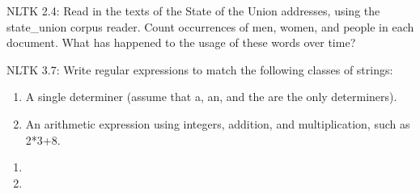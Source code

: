 \documentclass[11pt,letterpaper,boxed]{hmcpset}
\begin{document}
\begin{problem}
NLTK 2.4: Read in the texts of the State of the Union addresses, using the state\_union corpus reader. Count occurrences of men, women, and people in each document. What has happened to the usage of these words over time?
\end{problem}
\begin{solution}
\vspace{10cm}
\end{solution}

\begin{problem}
NLTK 3.7: Write regular expressions to match the following classes of
strings:
\begin{enumerate}
   \item  A single determiner (assume that a, an, and the are the only determiners).
    \item An arithmetic expression using integers, addition, and multiplication, such as 2*3+8.
\end{enumerate}
\end{problem}

\begin{solution}
\begin{enumerate}
    \item \vspace{2cm}
    \item \vspace{2cm}
\end{enumerate}
\end{solution}
\end{document}
